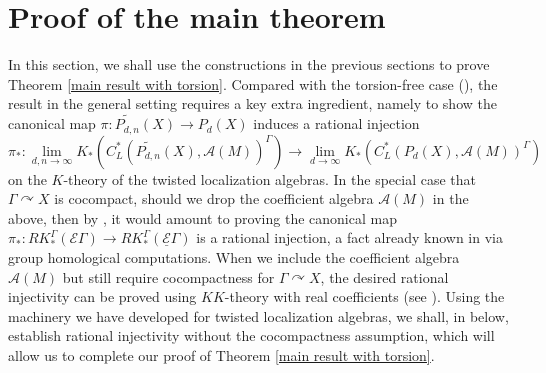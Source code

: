 \documentclass[11pt]{article}
\theoremstyle{definition}
\theoremstyle{plain}
\def\A{\mathcal A}\def\C{\mathcal C}\def\B{\mathcal B}\def\E{\mathcal E}\def\O{\mathcal O}\def\h{\mathfrak h}\def\K{\mathcal K}\def\F{\mathcal F}\def\P{\mathcal P}\def\L{\mathcal L}\def\R{\mathcal R}\def\Q{\mathcal Q}\def\H{\mathcal H}\def\S{\mathcal S}\def\N{\mathcal N}\def\U{\mathcal U}\def\V{\mathcal V}
\def\MRdnX{\widetilde{P_{d,n}}(X)}
\def\EG{\underline{\E}\Gamma}
\def\Ga{\Gamma}
\begin{document}
\section{Proof of the main theorem}\label{sec: Proof of the main theorem}

In this section, we shall use the constructions in the previous sections to prove Theorem \ref{main result with torsion}. 
Compared with the torsion-free case (), 
the result in the general setting requires 
a key extra ingredient, namely to show the canonical map $\pi:\MRdnX\to P_d(X)$ induces a rational injection 
\[
    \pi_* \colon \lim_{d,n\to\infty} K_*(C^*_L(\MRdnX,\A(M))^{\Ga}) \to \lim_{d\to\infty} K_*(C^*_L(P_d(X),\A(M))^{\Ga})
\]
on the $K$-theory of the twisted localization algebras. 
In the special case that $\Gamma \curvearrowright X$ is cocompact, 
should we drop the coefficient algebra $\A(M)$ in the above, then by , it would amount to proving the canonical map $\pi_* \colon RK^{\Ga}_*(\E\Ga) \to RK^{\Ga}_*(\EG)$ is a rational injection, a fact already known in \cite[Section~7]{BCH1994} via group homological computations. 
When we include the coefficient algebra $\A(M)$ but still require cocompactness for $\Gamma \curvearrowright X$, the desired rational injectivity can be proved using $KK$-theory with real coefficients (see \cite[Section~6]{AAS2020}). 
Using the machinery we have developed for twisted localization algebras, we shall, in  below, establish rational injectivity without the cocompactness assumption, which will allow us to complete our proof of Theorem \ref{main result with torsion}. 
\end{document}
